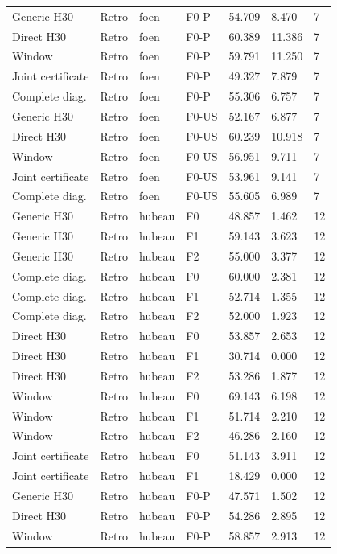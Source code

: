 {\begin{longtable}{p{}p{}p{}p{}p{}p{}p{}}
Generic H30 & Retro & foen & F0-P & 54.709 & 8.470 & 7 \\
Direct H30 & Retro & foen & F0-P & 60.389 & 11.386 & 7 \\
Window & Retro & foen & F0-P & 59.791 & 11.250 & 7 \\
Joint certificate & Retro & foen & F0-P & 49.327 & 7.879 & 7 \\
Complete diag. & Retro & foen & F0-P & 55.306 & 6.757 & 7 \\
Generic H30 & Retro & foen & F0-US & 52.167 & 6.877 & 7 \\
Direct H30 & Retro & foen & F0-US & 60.239 & 10.918 & 7 \\
Window & Retro & foen & F0-US & 56.951 & 9.711 & 7 \\
Joint certificate & Retro & foen & F0-US & 53.961 & 9.141 & 7 \\
Complete diag. & Retro & foen & F0-US & 55.605 & 6.989 & 7 \\
Generic H30 & Retro & hubeau & F0 & 48.857 & 1.462 & 12 \\
Generic H30 & Retro & hubeau & F1 & 59.143 & 3.623 & 12 \\
Generic H30 & Retro & hubeau & F2 & 55.000 & 3.377 & 12 \\
Complete diag. & Retro & hubeau & F0 & 60.000 & 2.381 & 12 \\
Complete diag. & Retro & hubeau & F1 & 52.714 & 1.355 & 12 \\
Complete diag. & Retro & hubeau & F2 & 52.000 & 1.923 & 12 \\
Direct H30 & Retro & hubeau & F0 & 53.857 & 2.653 & 12 \\
Direct H30 & Retro & hubeau & F1 & 30.714 & 0.000 & 12 \\
Direct H30 & Retro & hubeau & F2 & 53.286 & 1.877 & 12 \\
Window & Retro & hubeau & F0 & 69.143 & 6.198 & 12 \\
Window & Retro & hubeau & F1 & 51.714 & 2.210 & 12 \\
Window & Retro & hubeau & F2 & 46.286 & 2.160 & 12 \\
Joint certificate & Retro & hubeau & F0 & 51.143 & 3.911 & 12 \\
Joint certificate & Retro & hubeau & F1 & 18.429 & 0.000 & 12 \\
Generic H30 & Retro & hubeau & F0-P & 47.571 & 1.502 & 12 \\
Direct H30 & Retro & hubeau & F0-P & 54.286 & 2.895 & 12 \\
Window & Retro & hubeau & F0-P & 58.857 & 2.913 & 12 \\

\end{longtable}}
